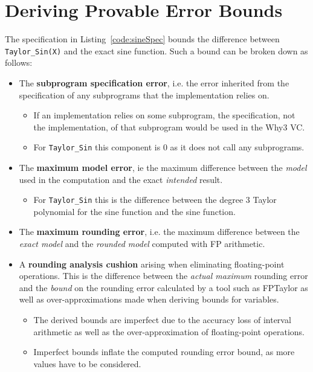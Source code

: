 \documentclass[runningheads]{llncs}
\begin{document}
\section{Deriving Provable Error Bounds}\label{sec:writing-specifications}

The specification in Listing~\ref{code:sineSpec} bounds the difference between \lstinline{Taylor_Sin(X)} and the exact sine function.
Such a bound can be broken down as follows:
\begin{itemize}
  \item The \textbf{subprogram specification error}, i.e. the error inherited from the specification of any subprograms that the implementation relies on.
  \begin{itemize}
    \item If an implementation relies on some subprogram, the specification, not the implementation, of that subprogram would be used in the Why3 VC.
    \item For \lstinline{Taylor_Sin} this component is $0$ as it does not call any subprograms.
  \end{itemize} 
  \item The \textbf{maximum model error}, ie the maximum difference between the \emph{model} used in the computation and the exact \emph{intended} result.
  \begin{itemize}
    \item For \lstinline{Taylor_Sin} this is the difference between the degree 3 Taylor polynomial for the sine function and the sine function.
  \end{itemize}
  \item The \textbf{maximum rounding error}, i.e. the maximum difference between the \emph{exact model} and the \emph{rounded model} computed with FP arithmetic.
  \item A \textbf{rounding analysis cushion} arising when eliminating floating-point operations.  This is the difference between the \emph{actual maximum} rounding error and the \emph{bound} on the rounding error calculated by a tool such as FPTaylor as well as over-approximations made when deriving bounds for variables. 
  \begin{itemize}
    \item The derived bounds are imperfect due to the accuracy loss of interval arithmetic as well as the over-approximation of floating-point operations.
    \item Imperfect bounds inflate the computed rounding error bound, as more values have to be considered.

\end{itemize}
\end{itemize}
\end{document}
